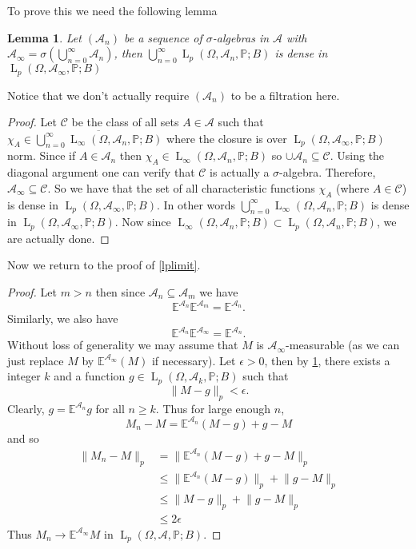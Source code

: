 \documentclass[]{report}
\newcommand{\lp}[2]{\operatorname{L}_{#1}({#2})}
\newcommand*{\Normb}[2]{\lVert {#1} \rVert_{#2}}
\newcommand{\pspc}{\Omega,\mathcal{A},\mathbb{P}}
\newcommand{\pspca}[2]{\Omega,{#1},\mathbb{#2}}
\newcommand*{\extop}[1]{\mathbb{E}^{{#1}}}
\newtheorem{lemma}[theorem]{Lemma}
\begin{document}
To prove this we need the following lemma
\begin{lemma}\label{sigmaapprox}
	Let $(\mathcal{A}_n)$ be a sequence of $\sigma$-algebras in $\mathcal{A}$ with $\mathcal{A}_{\infty}= \sigma\left( \bigcup_{n=0}^{\infty}\mathcal{A}_n \right)$, then $\bigcup_{n=0}^{\infty}\lp{p}{\pspca{\mathcal{A}_n}{P};B}$ is dense in $\lp{p}{\pspca{\mathcal{A}_{\infty}}{P};B}$
\end{lemma}
Notice that we don't actually require $(\mathcal{A}_n)$ to be a filtration here. 
\begin{proof}
	Let $\mathcal{C}$ be the class of all sets $A \in \mathcal{A}$ such that $\chi_A \in \overline{\bigcup_{n=0}^{\infty} \lp{\infty}{\pspca{\mathcal{A}_n}{P};B} }$ where the closure is over $\lp{p}{\pspca{\mathcal{A_{\infty}}}{P};B}$ norm. Since if $A \in \mathcal{A}_n$ then $\chi_A \in \lp{\infty}{\pspca{\mathcal{A}_n}{P};B}$ so $\cup \mathcal{A}_n \subseteq \mathcal{C}$. Using the diagonal argument one can verify that $\mathcal{C}$ is actually a $\sigma$-algebra. Therefore, $\mathcal{A}_{\infty} \subseteq \mathcal{C}$. So we have that the set of all characteristic functions $\chi_A$ (where $A \in \mathcal{C}$) is dense in $\lp{p}{\pspca{\mathcal{A}_{\infty}}{P};B}$. In other words $\bigcup_{n=0}^{\infty}\lp{\infty}{\pspca{\mathcal{A}_n}{P};B}$ is dense in $\lp{p}{\pspca{\mathcal{A}_{\infty}}{P};B}$. Now since $\lp{\infty}{\pspca{\mathcal{A}_n}{P};B} \subset \lp{p}{\pspca{\mathcal{A}_n}{P};B}$, we are actually done.
\end{proof}
 Now we return to the proof of \ref{lplimit}.
 \begin{proof}
 	Let $m>n$ then since $\mathcal{A}_n \subseteq \mathcal{A}_m$ we have \[ \extop{\mathcal{A}_n}\extop{\mathcal{A}_m}=\extop{\mathcal{A}_n}. \]
 	Similarly, we also have \[ \extop{\mathcal{A}_n}\extop{\mathcal{A}_{\infty}}=\extop{\mathcal{A}_n}. \]
 	Without loss of generality we may assume that $M$ is $\mathcal{A}_{\infty}$-measurable (as we can just replace $M$ by $\extop{\mathcal{A_{\infty}}}(M)$ if necessary). Let $\epsilon>0$, then by \ref{sigmaapprox}, there exists a integer $k$ and a function $g \in \lp{p}{\pspca{\mathcal{A}_k}{P};B}$ such that \[ \Normb{M-g}{p}<\epsilon. \]Clearly, $g=\extop{\mathcal{A}_n}g$ for all $n \geq k$. Thus for large enough $n$, \[ M_n-M= \extop{\mathcal{A}_n}(M-g)+g-M \]
 	and so 
 	\[
 	\begin{aligned}
 	\Normb{M_n-M}{p} &= \Normb{\extop{\mathcal{A}_n}(M-g)+g-M }{p}\\
 	&\leq \Normb{\extop{\mathcal{A}_n}(M-g) }{p} + \Normb{g-M }{p}\\
 	&\leq \Normb{M-g }{p} + \Normb{g-M }{p}\\
 	&\leq 2\epsilon
 	\end{aligned}
 	\]
 	Thus $M_n \rightarrow \extop{\mathcal{A}_{\infty}}M$ in $\lp{p}{\pspc ;B}$.
 \end{proof}
\end{document}
